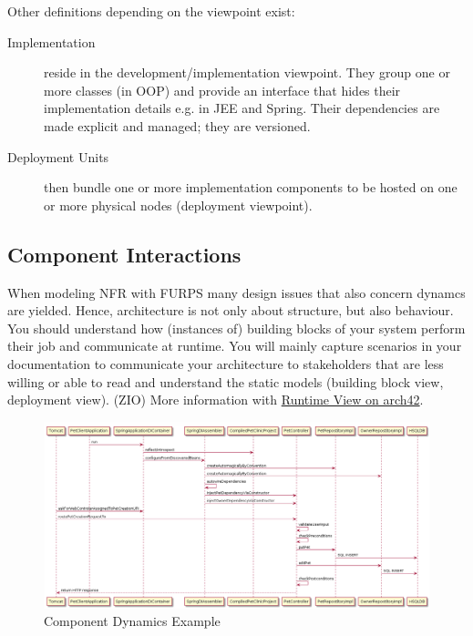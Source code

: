\documentclass[../Main.tex]{subfiles}
\begin{document}
Other definitions depending on the viewpoint exist:
\begin{description}
    \item[Implementation]  reside in the development/implementation viewpoint. They group one 
    or more classes (in OOP) and provide an interface that hides their implementation details e.g. in 
    JEE and Spring. Their dependencies are made explicit and managed; they are versioned.
    \item[Deployment Units] then bundle one or more implementation components to be hosted on one or 
    more physical nodes (deployment viewpoint).
\end{description}

\newpage
\subsection{Component Interactions}
When modeling NFR with FURPS many design issues that also
concern dynamcs are yielded. Hence, architecture is not only
about structure, but also behaviour.
You should understand how (instances of) building blocks of
your system perform their job and communicate at runtime.
You will mainly capture scenarios in your documentation
to communicate your architecture to stakeholders that are
less willing or able to read and understand the static models
(building block view, deployment view). (ZIO)
More information with \href{http://docs.arc42.org/section-6/}{Runtime View on arch42}.

\begin{figure}[H]
    \centering
    \includegraphics[width=1\linewidth]{Images/component-dynamics.png}
    \caption{Component Dynamics Example}
\end{figure}
\newpage

\newpage
\end{document}
